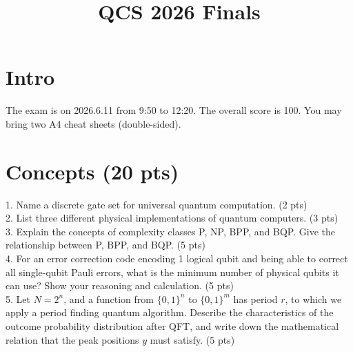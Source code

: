 \documentclass[12pt]{article}
\title{\textbf{QCS 2026 Finals}}
\author{}
\date{}
\begin{document}
\maketitle

\section*{Intro}
The exam is on 2026.6.11 from 9:50 to 12:20. The overall score is 100. You may bring two A4 cheat sheets (double-sided).

\section{Concepts (20 pts)}
1. Name a discrete gate set for universal quantum computation. (2 pts)\\
2. List three different physical implementations of quantum computers. (3 pts)\\
3. Explain the concepts of complexity classes P, NP, BPP, and BQP. Give the relationship between P, BPP, and BQP. (5 pts)\\
4. For an error correction code encoding 1 logical qubit and being able to correct all single-qubit Pauli errors, what is the minimum number of physical qubits it can use? Show your reasoning and calculation. (5 pts)\\
5. Let $N=2^n$, and a function from $\{0,1\}^n$ to $\{0,1\}^m$ has period $r$, to which we apply a period finding quantum algorithm. Describe the characteristics of the outcome probability distribution after QFT, and write down the mathematical relation that the peak positions $y$ must satisfy. (5 pts)
\end{document}

